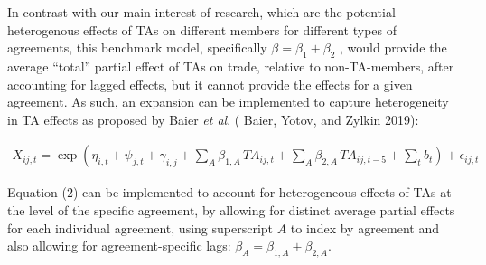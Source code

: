 In contrast with our main interest of research, which are the potential
heterogenous effects of TAs on different members for different types of
agreements, this benchmark model, specifically
\(\beta = \beta_{1} + \beta_{2}\) , would provide the average ``total''
partial effect of TAs on trade, relative to non-TA-members, after accounting for lagged effects, but
it cannot provide the effects for a given agreement. As such, an
expansion can be implemented to capture heterogeneity in TA effects as
proposed by Baier \emph{et al}. (\cite{baier_widely_2019} Baier, Yotov, and Zylkin 2019):

\begin{multline}
    X_{ij,t} = \exp\left(\eta_{i,t} + \psi_{j,t} + \gamma_{i,j} + \sum_{A} \beta_{1,A} \, TA_{ij,t} \right. + \sum_{A} \beta_{2,A} \, TA_{ij,t-5} + \left. \sum_{t} b_{t} \right) + \epsilon_{ij,t}
\end{multline}

Equation (2) can be implemented to account for heterogeneous effects of
TAs at the level of the specific agreement, by allowing for distinct
average partial effects for each individual agreement, using superscript
\(A\) to index by agreement and also allowing for agreement-specific
lags: \(\beta_{A} = \beta_{1,A} + \beta_{2,A}\).